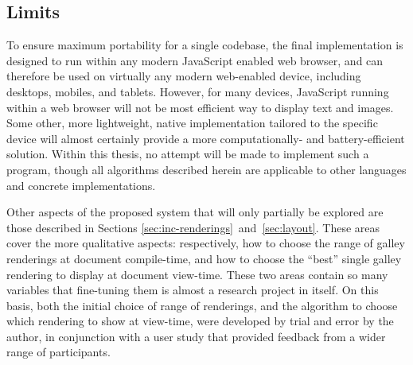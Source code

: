 \subsection{Limits}

To ensure maximum portability for a single codebase, the final implementation is designed to run within any modern JavaScript enabled web browser, and can therefore be used on virtually any modern web-enabled device, including desktops, mobiles, and tablets. However, for many devices, JavaScript running within a web browser will not be most efficient way to display text and images. Some other, more lightweight, native implementation tailored to the specific device will almost certainly provide a more computationally- and bat\-tery-ef\-fi\-cient solution. Within this thesis, no attempt will be made to implement such a program, though all algorithms described herein are applicable to other languages and concrete implementations.

Other aspects of the proposed system that will only partially be explored are those described in Sections \ref{sec:inc-renderings}~and~\ref{sec:layout}. These areas cover the more qualitative aspects: respectively, how to choose the range of galley renderings at document compile-time, and how to choose the ``best'' single galley rendering to display at document view-time. These two areas contain so many variables that fine-tuning them is almost a research project in itself. On this basis, both the initial choice of range of renderings, and the algorithm to choose which rendering to show at view-time, were developed by trial and error by the author, in conjunction with a user study that provided feedback from a wider range of participants.
